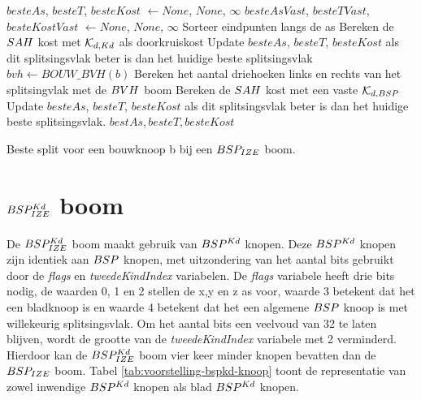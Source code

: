 \begin{dutchalgorithm}
    \begin{algorithmic}       
            \State $besteAs$, $besteT$, $besteKost$ $\gets None$, $None$, $\infty$
            \State $besteAsVast$, $besteTVast$, $besteKostVast$ $\gets None$, $None$, $\infty$
                \State Sorteer eindpunten langs de as
                    \State Bereken de $SAH$ kost met $\mathcal{K}_{d,Kd}$ als doorkruiskost
                    \State Update $besteAs$, $besteT$, $besteKost$ als dit splitsingsvlak beter is dan het huidige beste splitsingsvlak
                \EndFor        
            \EndFor
            \State $bvh \gets BOUW\_BVH(b)$
                    \State Bereken het aantal driehoeken links en rechts van het splitsingvlak met de $BVH$ boom
                    \State Bereken de $SAH$ kost met een vaste $\mathcal{K}_{d,BSP}$ 
                    \State Update $besteAs$, $besteT$, $besteKost$ als dit splitsingsvlak beter is dan het huidige beste splitsingsvlak.
                \EndFor       
            \EndFor
            \State \Return $bestAs, besteT, besteKost$
        \EndFunction
    \end{algorithmic}
    \caption{Beste split voor een bouwknoop b bij een $BSP_{IZE}$ boom.}
    \label{alg:bspize-beste-split}
\end{dutchalgorithm}


\section{$BSP^{Kd}_{IZE}$ boom}
\label{sec:h4-bspizefastkd}
De $BSP^{Kd}_{IZE}$ boom maakt gebruik van $BSP^{Kd}$ knopen. 
Deze $BSP^{Kd}$ knopen zijn identiek aan $BSP$ knopen, met uitzondering van het aantal bits gebruikt door de \textit{flags} en \textit{tweedeKindIndex} variabelen. 
De \textit{flags} variabele heeft drie bits nodig, de waarden 0, 1 en 2 stellen de x,y en z as voor, waarde 3 betekent dat het een bladknoop is en waarde 4 betekent dat het een algemene $BSP$ knoop is met willekeurig splitsingsvlak.
Om het aantal bits een veelvoud van 32 te laten blijven, wordt de grootte van de \textit{tweedeKindIndex} variabele met 2 verminderd.
Hierdoor kan de $BSP^{Kd}_{IZE}$ boom vier keer minder knopen bevatten dan de $BSP_{IZE}$ boom.
Tabel \ref{tab:voorstelling-bspkd-knoop} toont de representatie van zowel inwendige $BSP^{Kd}$ knopen als blad $BSP^{Kd}$ knopen.\\

